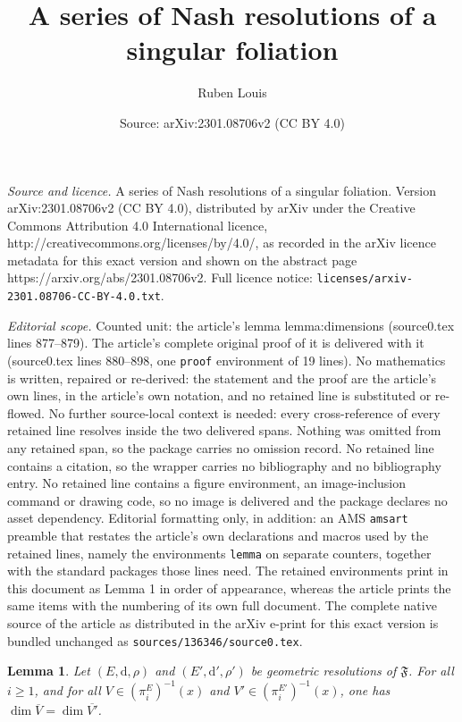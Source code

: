 \documentclass[10pt,a4paper]{amsart}
\title{A series of Nash resolutions of a singular foliation}
\author{Ruben Louis}
\date{Source: arXiv:2301.08706v2 (CC BY 4.0)}
\newtheorem{lemma}{Lemma}
\newcommand{\dd}{\mathrm{d}}
\begin{document}
\maketitle

\noindent\emph{Source and licence.} A series of Nash resolutions of a singular foliation. Version arXiv:2301.08706v2 (CC BY 4.0), distributed by arXiv under the Creative Commons Attribution 4.0 International licence, http://creativecommons.org/licenses/by/4.0/, as recorded in the arXiv licence metadata for this exact version and shown on the abstract page https://arxiv.org/abs/2301.08706v2. Full licence notice: \texttt{licenses/arxiv-2301.08706-CC-BY-4.0.txt}.\par\smallskip

\noindent\textit{Editorial scope.} Counted unit: the article's lemma lemma:dimensions (source0.tex lines 877--879). The article's complete original proof of it is delivered with it (source0.tex lines 880--898, one \texttt{proof} environment of 19 lines). No mathematics is written, repaired or re-derived: the statement and the proof are the article's own lines, in the article's own notation, and no retained line is substituted or re-flowed.  No further source-local context is needed: every cross-reference of every retained line resolves inside the two delivered spans.  Nothing was omitted from any retained span, so the package carries no omission record.  No retained line contains a citation, so the wrapper carries no bibliography and no bibliography entry.  No retained line contains a figure environment, an image-inclusion command or drawing code, so no image is delivered and the package declares no asset dependency.  Editorial formatting only, in addition: an AMS \texttt{amsart} preamble that restates the article's own declarations and macros used by the retained lines, namely the environments \texttt{lemma} on separate counters, together with the standard packages those lines need.  The retained environments print in this document as Lemma 1 in order of appearance, whereas the article prints the same items with the numbering of its own full document.  The complete native source of the article as distributed in the arXiv e-print for this exact version is bundled unchanged as \texttt{sources/136346/source0.tex}.
\begin{lemma}\label{lemma:dimensions}
{Let $(E, \dd, \rho)$ and $(E', \dd', \rho')$ be geometric resolutions of $\mathfrak F$. For all $i\geq 1$,  and for all  $V\in(\pi_i^{E})^{-1}(x)$ and $V'\in(\pi_i^{E'})^{-1}(x)$, one has  $\dim \overline{V}=\dim \overline{V'}$.}
\end{lemma}
\end{document}
